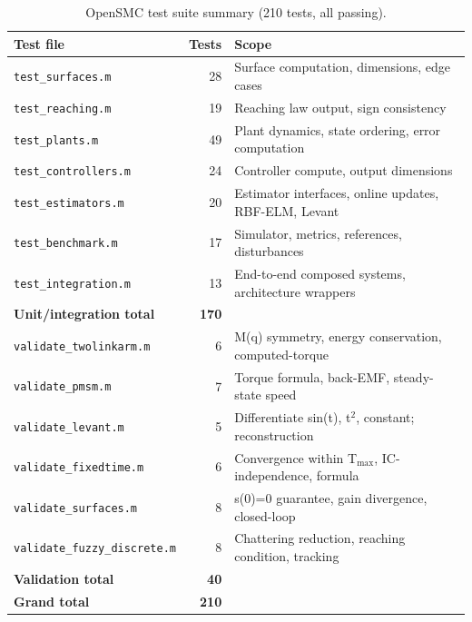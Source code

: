 \documentclass[preprint,12pt]{elsarticle}
\begin{document}
\begin{table}[t]
\centering
\small
\caption{OpenSMC test suite summary (210 tests, all passing).}
\label{tab:tests}
\begin{tabular}{lrl}
\toprule
\textbf{Test file} & \textbf{Tests} & \textbf{Scope} \\
\midrule
\texttt{test\_surfaces.m}       & 28 & Surface computation, dimensions, edge cases \\
\texttt{test\_reaching.m}       & 19 & Reaching law output, sign consistency \\
\texttt{test\_plants.m}         & 49 & Plant dynamics, state ordering, error computation \\
\texttt{test\_controllers.m}    & 24 & Controller compute, output dimensions \\
\texttt{test\_estimators.m}     & 20 & Estimator interfaces, online updates, RBF-ELM, Levant \\
\texttt{test\_benchmark.m}      & 17 & Simulator, metrics, references, disturbances \\
\texttt{test\_integration.m}    & 13 & End-to-end composed systems, architecture wrappers \\
\midrule
\textbf{Unit/integration total} & \textbf{170} & \\
\midrule
\texttt{validate\_twolinkarm.m} &  6 & M(q) symmetry, energy conservation, computed-torque \\
\texttt{validate\_pmsm.m}       &  7 & Torque formula, back-EMF, steady-state speed \\
\texttt{validate\_levant.m}     &  5 & Differentiate sin(t), t$^2$, constant; reconstruction \\
\texttt{validate\_fixedtime.m}  &  6 & Convergence within T$_{\max}$, IC-independence, formula \\
\texttt{validate\_surfaces.m}   &  8 & s(0)=0 guarantee, gain divergence, closed-loop \\
\texttt{validate\_fuzzy\_discrete.m} & 8 & Chattering reduction, reaching condition, tracking \\
\midrule
\textbf{Validation total}       & \textbf{40} & \\
\midrule
\textbf{Grand total}            & \textbf{210} & \\
\bottomrule
\end{tabular}
\end{table}
\end{document}
